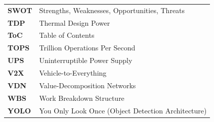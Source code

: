 \documentclass[12pt,a4paper,oneside]{report}
\begin{document}
\begin{longtable}{p{3.0cm} p{11.5cm}}
\textbf{SWOT} & Strengths, Weaknesses, Opportunities, Threats \\
\textbf{TDP} & Thermal Design Power \\
\textbf{ToC} & Table of Contents \\
\textbf{TOPS} & Trillion Operations Per Second \\
\textbf{UPS} & Uninterruptible Power Supply \\
\textbf{V2X} & Vehicle-to-Everything \\
\textbf{VDN} & Value-Decomposition Networks \\
\textbf{WBS} & Work Breakdown Structure \\
\textbf{YOLO} & You Only Look Once (Object Detection Architecture) \\
\bottomrule
\end{longtable}

\newpage

\setcounter{page}{1}










\end{document}
